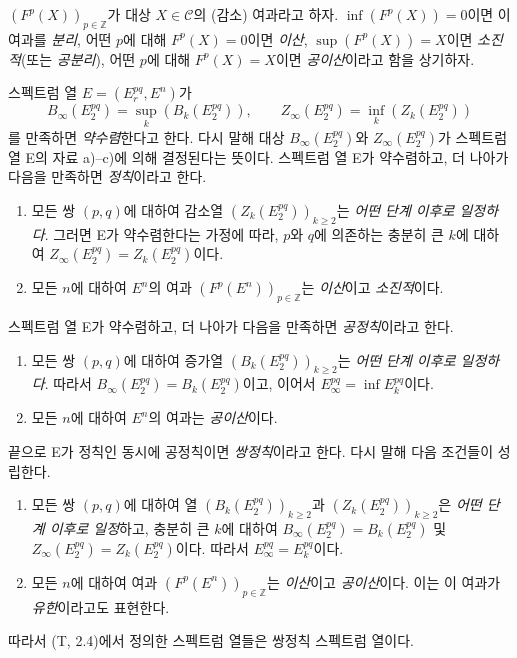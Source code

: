 \begin{env}[11.1.3]
\label{0.11.1.3-fr}
$(F^p(X))_{p\in\mathbb Z}$가 대상 $X\in\mathcal C$의 (감소) 여과라고
하자. $\inf(F^p(X))=0$이면 이 여과를 \emph{분리}, 어떤 $p$에 대해
$F^p(X)=0$이면 \emph{이산}, $\sup(F^p(X))=X$이면 \emph{소진적}(또는
\emph{공분리}), 어떤 $p$에 대해 $F^p(X)=X$이면 \emph{공이산}이라고
함을 상기하자.

스펙트럼 열 $E=(E_r^{pq},E^n)$가
\[
  B_\infty(E_2^{pq})=\sup_k(B_k(E_2^{pq})),\qquad
  Z_\infty(E_2^{pq})=\inf_k(Z_k(E_2^{pq}))
\]
를 만족하면 \emph{약수렴}한다고 한다. 다시 말해 대상
$B_\infty(E_2^{pq})$와 $Z_\infty(E_2^{pq})$가 스펙트럼 열 E의 자료
a)--c)에 의해 결정된다는 뜻이다. 스펙트럼 열 E가 약수렴하고, 더
나아가 다음을 만족하면 \emph{정칙}이라고 한다.
\begin{enumerate}
  \item[$1^\circ$] 모든 쌍 $(p,q)$에 대하여 감소열
    $(Z_k(E_2^{pq}))_{k\geq2}$는 \emph{어떤 단계 이후로 일정하다}.
    그러면 E가 약수렴한다는 가정에 따라, $p$와 $q$에 의존하는 충분히
    큰 $k$에 대하여
    $Z_\infty(E_2^{pq})=Z_k(E_2^{pq})$이다.
  \item[$2^\circ$] 모든 $n$에 대하여 $E^n$의 여과
    $(F^p(E^n))_{p\in\mathbb Z}$는 \emph{이산}이고 \emph{소진적}이다.
\end{enumerate}

스펙트럼 열 E가 약수렴하고, 더 나아가 다음을 만족하면
\emph{공정칙}이라고 한다.
\begin{enumerate}
  \item[$3^\circ$] 모든 쌍 $(p,q)$에 대하여 증가열
    $(B_k(E_2^{pq}))_{k\geq2}$는 \emph{어떤 단계 이후로 일정하다}.
    따라서 $B_\infty(E_2^{pq})=B_k(E_2^{pq})$이고, 이어서
    $E_\infty^{pq}=\inf E_k^{pq}$이다.
  \item[$4^\circ$] 모든 $n$에 대하여 $E^n$의 여과는
    \emph{공이산}이다.
\end{enumerate}

끝으로 E가 정칙인 동시에 공정칙이면 \emph{쌍정칙}이라고 한다. 다시
말해 다음 조건들이 성립한다.
\begin{enumerate}
  \item[(a)] 모든 쌍 $(p,q)$에 대하여 열
    $(B_k(E_2^{pq}))_{k\geq2}$과 $(Z_k(E_2^{pq}))_{k\geq2}$은
    \emph{어떤 단계 이후로 일정}하고, 충분히 큰 $k$에 대하여
    $B_\infty(E_2^{pq})=B_k(E_2^{pq})$ 및
    $Z_\infty(E_2^{pq})=Z_k(E_2^{pq})$이다. 따라서
    $E_\infty^{pq}=E_k^{pq}$이다.
  \item[(b)] 모든 $n$에 대하여 여과
    $(F^p(E^n))_{p\in\mathbb Z}$는 \emph{이산}이고 \emph{공이산}이다.
    이는 이 여과가 \emph{유한}이라고도 표현한다.
\end{enumerate}

따라서 (T, 2.4)에서 정의한 스펙트럼 열들은 쌍정칙 스펙트럼 열이다.
\end{env}

